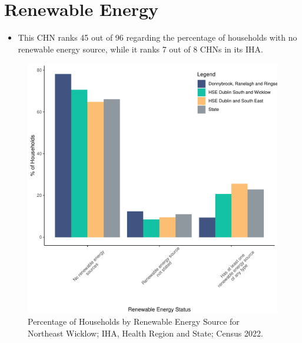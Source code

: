 \documentclass{article}
\begin{document}
\section{Renewable Energy}\label{sect:RE}
\begin{itemize}
\item This CHN ranks  45 out of 96 regarding the percentage of households with no renewable energy source, while it ranks   7 out of 8 CHNs in its IHA.
\end{itemize}
\begin{figure}[H]
	\centering
	\includegraphics[width = 140mm]{../figures/RenewableEnergyED.pdf}
	\caption{Percentage of Households by Renewable Energy Source for Northeast Wicklow; IHA, Health Region and State; Census 2022.}
	\label{fig:vbnv}
	\end{figure}
\end{document}
